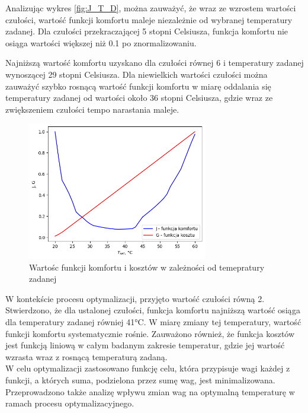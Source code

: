\documentclass[a4paper,twoside,12pt]{book}
\begin{document}
Analizując wykres \ref{fig:J_T_D}, można zauważyć, że wraz ze wzrostem wartości czułości, wartość funkcji komfortu maleje niezależnie od wybranej temperatury zadanej. Dla czułości przekraczającej 5 stopni Celsiusza, funkcja komfortu nie osiąga wartości większej niż 0.1 po znormalizowaniu.

Najniższą wartość komfortu uzyskano dla czułości równej 6 i temperatury zadanej wynoszącej 29 stopni Celsiusza. Dla niewielkich wartości czułości można zauważyć szybko rosnącą wartość funkcji komfortu w miarę oddalania się temperatury zadanej od wartości około 36 stopni Celsiusza, gdzie wraz ze zwiększeniem czułości tempo narastania maleje.\\



\begin{figure}[!h]
  \centering
  \includegraphics[width=0.7\textwidth]{img/j_g_2d.png}
  \caption{Wartośc funkcji komfortu i kosztów w zależności od temepratury zadanej}
  \label{fig:etykieta-rysunku}
\end{figure}
W kontekście procesu optymalizacji, przyjęto wartość czułości równą 2. Stwierdzono, że dla ustalonej czułości, funkcja komfortu najniższą wartość osiąga dla temperatury zadanej równiej 41°C. W miarę zmiany tej temperatury, wartość funkcji komfortu systematycznie rośnie. Zauważono również, że funkcja kosztów jest funkcją liniową w całym badanym zakresie temperatur, gdzie jej wartość wzrasta wraz z rosnącą temperaturą zadaną.\\

W celu optymalizacji zastosowano funkcję celu, która przypisuje wagi każdej z funkcji, a których suma, podzielona przez sumę wag, jest minimalizowana. Przeprowadzono także analizę wpływu zmian wag na optymalną temperaturę w ramach procesu optymalizacyjnego.
\end{document}
